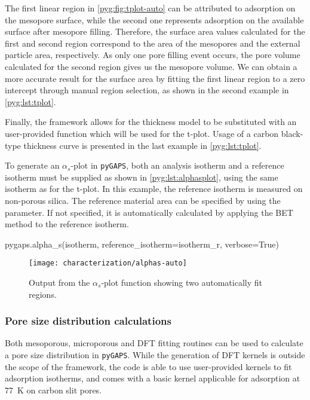 The first linear region in \autoref{pyg:fig:tplot-auto} can be attributed
to adsorption on the mesopore surface,
while the second one represents adsorption on the available surface
after mesopore filling. Therefore, the surface area values calculated 
for the first and second region correspond to the area of the mesopores
and the external particle area, respectively. As only one pore filling 
event occurs, the pore volume calculated for the second region gives
us the mesopore volume. We can obtain a more accurate result for the
surface area by fitting the first linear region to a zero intercept
through manual region selection, as shown in the second example in 
\autoref{pyg:lst:tplot}.

Finally, the framework allows for the thickness model to be substituted
with an user-provided function which will be used for the t-plot.
Usage of a carbon black-type thickness curve is presented in the last
example in \autoref{pyg:lst:tplot}.

To generate an \(\alpha_s\)-plot in \texttt{pyGAPS}, both 
an analysis isotherm and a reference isotherm must be supplied 
as shown in \autoref{pyg:lst:alphasplot}, using the same isotherm
as for the t-plot.
In this example, the reference isotherm is measured on non-porous 
silica. The reference material area can be specified by using 
the  parameter. If not specified, it 
is automatically calculated by applying the \gls{BET}
method to the reference isotherm.

\begin{python}[caption={Generating an \(\alpha_s\)-plot},label={pyg:lst:alphasplot}]
pygaps.alpha_s(isotherm, 
			   reference_isotherm=isotherm_r,
			   verbose=True)
\end{python}

\begin{figure}[!htb]
	\centering

	\texttt{[image: characterization/alphas-auto]}
	\caption{Output from the \(\alpha_s\)-plot function showing two
		automatically fit regions.}%
	\label{pyg:fig:alphasplot}

\end{figure}


\subsubsection{Pore size distribution calculations}

Both mesoporous, microporous and \gls{DFT} fitting routines can be
used to calculate a pore size distribution in \texttt{pyGAPS}. 
While the generation of \gls{DFT} kernels is outside the scope of the
framework, the code is able to use user-provided kernels to fit adsorption 
isotherms, and comes with a basic kernel applicable for  
adsorption at \SI{77}{\kelvin} on carbon slit pores.

